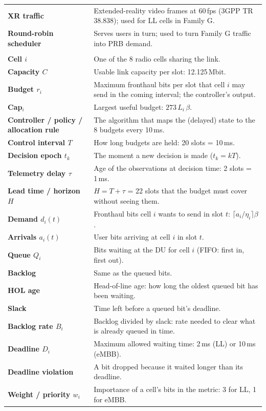 \documentclass[11pt,a4paper]{article}
\begin{document}
\begin{longtable}{>{\raggedright\arraybackslash\bfseries}p{3.6cm}>{\raggedright\arraybackslash}p{12.2cm}}
XR traffic & Extended-reality video frames at 60\,fps (3GPP TR 38.838); used for LL cells in Family G. \\
Round-robin scheduler & Serves users in turn; used to turn Family G traffic into PRB demand. \\
\multicolumn{2}{l}{\color{iitblue}\normalsize\textbf{Part B model}}\\
Cell $i$ & One of the 8 radio cells sharing the link. \\
Capacity $C$ & Usable link capacity per slot: 12.125\,Mbit. \\
Budget $r_i$ & Maximum fronthaul bits per slot that cell $i$ may send in the coming interval; the controller's output. \\
Cap$_i$ & Largest useful budget: $273\,L_i\,\beta$. \\
Controller / policy / allocation rule & The algorithm that maps the (delayed) state to the 8 budgets every 10\,ms. \\
Control interval $T$ & How long budgets are held: 20 slots = 10\,ms. \\
Decision epoch $t_k$ & The moment a new decision is made ($t_k = kT$). \\
Telemetry delay $\tau$ & Age of the observations at decision time: 2 slots = 1\,ms. \\
Lead time / horizon $H$ & $H = T + \tau$ = 22 slots that the budget must cover without seeing them. \\
Demand $d_i(t)$ & Fronthaul bits cell $i$ wants to send in slot $t$: $\lceil a_i/\eta_i\rceil\beta$. \\
Arrivals $a_i(t)$ & User bits arriving at cell $i$ in slot $t$. \\
Queue $Q_i$ & Bits waiting at the DU for cell $i$ (FIFO: first in, first out). \\
Backlog & Same as the queued bits. \\
HOL age & Head-of-line age: how long the oldest queued bit has been waiting. \\
Slack & Time left before a queued bit's deadline. \\
Backlog rate $B_i$ & Backlog divided by slack: rate needed to clear what is already queued in time. \\
Deadline $D_i$ & Maximum allowed waiting time: 2\,ms (LL) or 10\,ms (eMBB). \\
Deadline violation & A bit dropped because it waited longer than its deadline. \\
Weight / priority $w_i$ & Importance of a cell's bits in the metric: 3 for LL, 1 for eMBB. \\

\end{longtable}
\end{document}
